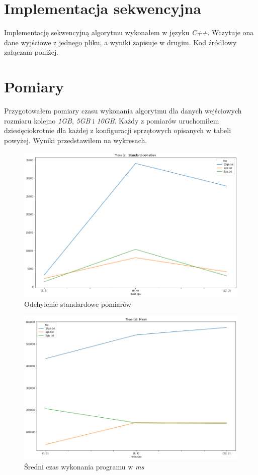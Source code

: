 \documentclass{article}
\begin{document}
    \section{Implementacja sekwencyjna}
    Implementację sekwencyjną algorytmu wykonałem w języku \textit{C++}. Wczytuje ona dane wyjściowe z jednego pliku, a wyniki zapisuje w drugim. Kod źródłowy załączam poniżej. 
    
    
    \section{Pomiary}
    Przygotowałem pomiary czasu wykonania algorytmu dla danych wejściowych rozmiaru kolejno \textit{1GB}, \textit{5GB} i \textit{10GB}. Każdy z pomiarów uruchomiłem dziesięciokrotnie dla każdej z konfiguracji sprzętowych opisanych w tabeli powyżej. Wyniki przedstawiłem na wykresach. 
    \begin{figure}[h!]
        \centering
        \includegraphics[width=15cm]{ex4/report/time_std.png}
        \caption{Odchylenie standardowe pomiarów}
    \end{figure}
    \begin{figure}[h!]
        \centering
        \includegraphics[width=15cm]{ex4/report/time_mean.png}
        \caption{Średni czas wykonania programu w \textit{ms}}
    \end{figure}
    
\end{document}
